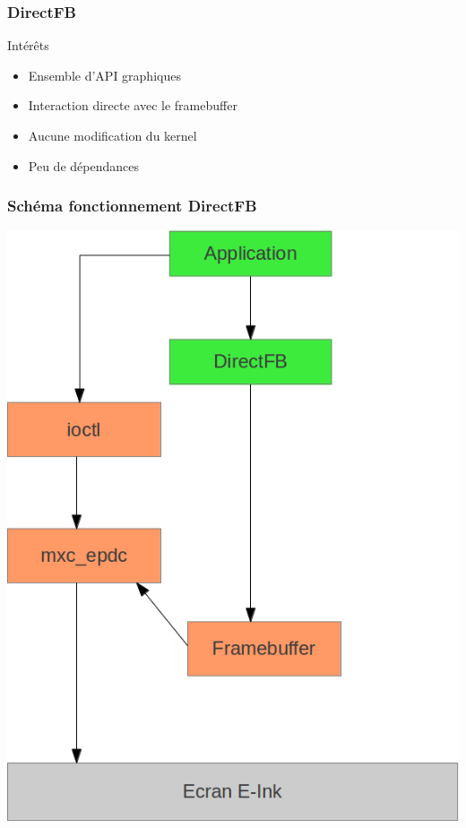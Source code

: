 \begin{frame}
\frametitle{DirectFB}

\begin{block}{Intérêts}
\begin{itemize}
\item Ensemble d'API graphiques
\item Interaction directe avec le framebuffer 
\item Aucune modification du kernel
\item Peu de dépendances
\end{itemize}
\end{block}

\end{frame}

\begin{frame}
\frametitle{Schéma fonctionnement DirectFB}

\begin{center}
\includegraphics[scale=0.3]{schema_direct_fb.png}
\end{center}

\end{frame}

